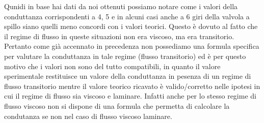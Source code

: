 Qunidi in base hai dati da noi ottenuti possiamo notare come i valori della conduttanza corrispondenti a 4, 5 e in alcuni casi anche a 6 giri della valvola a spillo siano quelli meno concordi con i valori teorici. Questo è dovuto al fatto che il regime  di flusso in queste situazioni non era viscoso, ma era transitorio. Pertanto come già accennato in precedenza non possediamo una formula specifica per valutare la conduttanza in tale regime (flusso transitorio) ed è per questo motivo che i valori non sono del tutto compatibili, in quanto il valore sperimentale restituisce un valore della conduttanza in pesenza di un regime di flusso transitorio mentre il valore teorico ricavato è valido/corretto nelle ipotesi in cui il regime di flusso sia viscoso e laminare. Infatti anche per lo stesso regime di flusso viscoso non si dispone di una formula che permetta di calcolare la condutanza se non nel caso di flusso viscoso laminare. 


